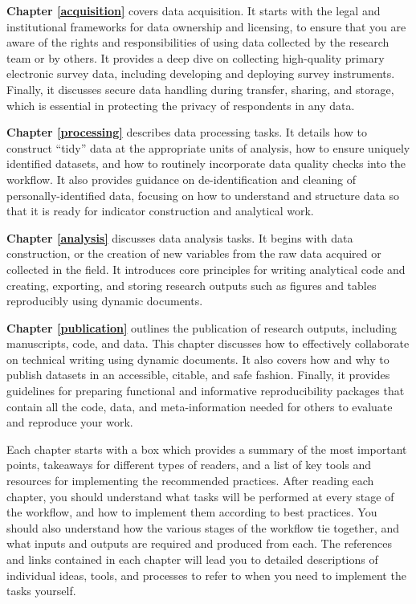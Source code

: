\documentclass[
]{book}
\begin{document}
\textbf{Chapter \ref{acquisition}} covers data acquisition. It starts with the legal and institutional frameworks for data ownership and licensing, to ensure that you are aware of the rights and responsibilities of using data collected by the research team or by others. It provides a deep dive on collecting high-quality primary electronic survey data, including developing and deploying survey instruments. Finally, it discusses secure data handling during transfer, sharing, and storage, which is essential in protecting the privacy of respondents in any data.

\textbf{Chapter \ref{processing}} describes data processing tasks. It details how to construct ``tidy'' data at the appropriate units of analysis, how to ensure uniquely identified datasets, and how to routinely incorporate data quality checks into the workflow. It also provides guidance on de-identification and cleaning of personally-identified data, focusing on how to understand and structure data so that it is ready for indicator construction and analytical work.

\textbf{Chapter \ref{analysis}} discusses data analysis tasks. It begins with data construction, or the creation of new variables from the raw data acquired or collected in the field. It introduces core principles for writing analytical code and creating, exporting, and storing research outputs such as figures and tables reproducibly using dynamic documents.

\textbf{Chapter \ref{publication}} outlines the publication of research outputs, including manuscripts, code, and data. This chapter discusses how to effectively collaborate on technical writing using dynamic documents. It also covers how and why to publish datasets in an accessible, citable, and safe fashion. Finally, it provides guidelines for preparing functional and informative reproducibility packages that contain all the code, data, and meta-information needed for others to evaluate and reproduce your work.

Each chapter starts with a box which provides a summary of the most important points, takeaways for different types of readers, and a list of key tools and resources for implementing the recommended practices. After reading each chapter, you should understand what tasks will be performed at every stage of the workflow, and how to implement them according to best practices. You should also understand how the various stages of the workflow tie together, and what inputs and outputs are required and produced from each. The references and links contained in each chapter will lead you to detailed descriptions of individual ideas, tools, and processes to refer to when you need to implement the tasks yourself.
\end{document}
